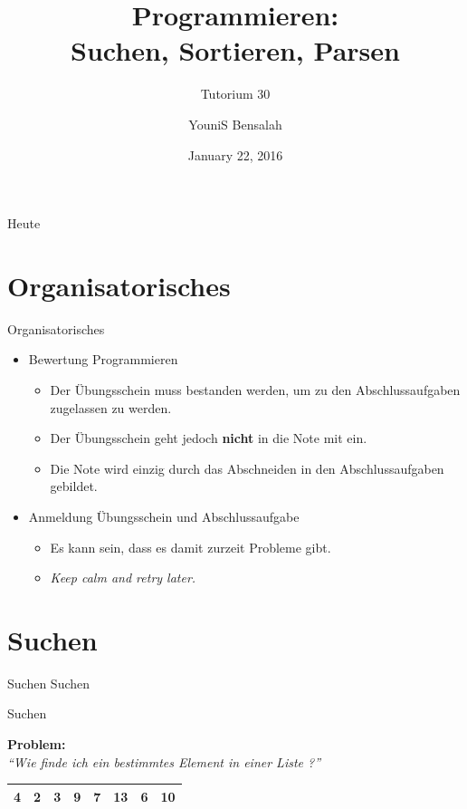 \documentclass[18pt]{beamer}
\title[Suchen, Sortieren, Parsen]{Programmieren:\\ Suchen, Sortieren, Parsen}
\subtitle{Tutorium 30}
\author{YouniS Bensalah}
\date{January 22, 2016}
\institute{Chair for Software Design and Quality}
\newcommand{\quotes}[1]{``#1''}
\begin{document}

\begin{frame}
\titlepage
\end{frame}

\begin{frame}{Heute}
\tableofcontents
\end{frame}

\section{Organisatorisches}

\begin{frame}{Organisatorisches}
    \begin{itemize}
        \item Bewertung Programmieren
        \begin{itemize}
            \item Der Übungsschein muss bestanden werden, um zu den Abschlussaufgaben zugelassen zu werden.
            \item Der Übungsschein geht jedoch \textbf{nicht} in die Note mit ein.
            \item Die Note wird einzig durch das Abschneiden in den Abschlussaufgaben gebildet.
        \end{itemize}
        \vspace{.3in}
        \item Anmeldung Übungsschein und Abschlussaufgabe
        \begin{itemize}
            \item Es kann sein, dass es damit zurzeit Probleme gibt.
            \item \textit{Keep calm and retry later.}
        \end{itemize}
    \end{itemize}
\end{frame}

\section{Suchen}

\begin{frame}{Suchen}
    \center
    \Huge{Suchen}
\end{frame}

\begin{frame}{Suchen}
    \begin{block}{}
        \textbf{Problem:}\\
        \textit{\quotes{Wie finde ich ein bestimmtes Element in einer Liste ?}}
    \end{block}
    \vspace{.2in}
    \begin{center}
        \begin{tabular}{|c|c|c|c|c|c|c|c|}
            \hline
            4 & 2 & 3 & 9 & 7 & 13 & 6 & 10 \\
            \hline
        \end{tabular}
    \end{center}
\end{frame}
\end{document}
